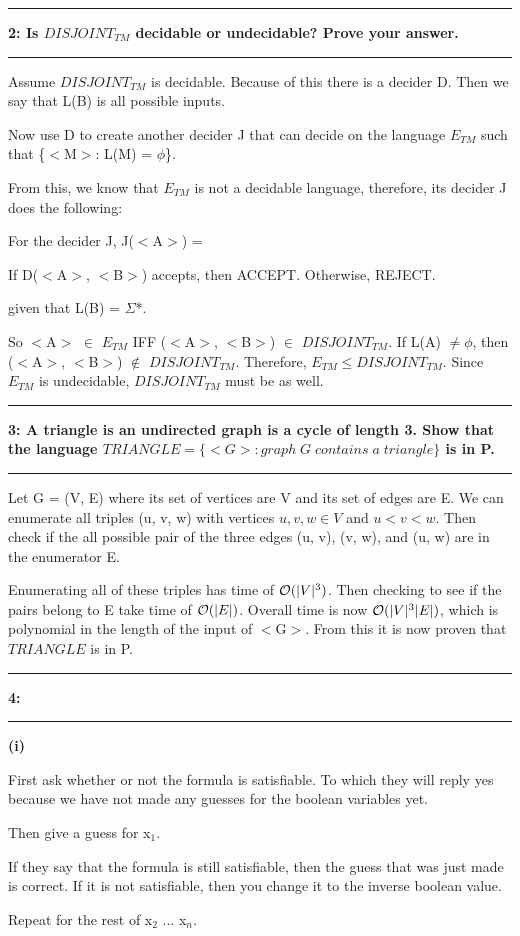 \documentclass[11pt]{article}
\newcommand\question[2]{\vspace{.25in}\hrule\textbf{#1: #2}\vspace{.5em}\hrule\vspace{.10in}}
\renewcommand\part[1]{\vspace{.10in}\textbf{(#1)}\par}
\begin{document}
\question{2}{Is $DISJOINT_{TM}$ decidable or undecidable? Prove your answer.} 
	Assume $DISJOINT_{TM}$ is decidable. Because of this there is a decider D. Then we say that L(B) is all possible inputs.\par
	Now use D to create another decider J that can decide on the language $E_{TM}$ such that \{$<$M$>$: L(M) = $\phi$\}.\par
	From this, we know that $E_{TM}$ is not a decidable language, therefore, its decider J does the following:\par
	For the decider J, J($<$A$>$) =\par
	\quad If D($<$A$>$, $<$B$>$) accepts, then ACCEPT. Otherwise, REJECT.\par
	given that L(B) = $\Sigma$*.\par
	So $<$A$>$ $\in$ $E_{TM}$ IFF ($<$A$>$, $<$B$>$) $\in$ $DISJOINT_{TM}$. If L(A) $\neq \phi$, then ($<$A$>$, $<$B$>$) $\notin$ $DISJOINT_{TM}$. Therefore, $E_{TM} \le DISJOINT_{TM}$. Since $E_{TM}$ is undecidable, $DISJOINT_{TM}$ must be as well.\par
	
\question{3}{A triangle is an undirected graph is a cycle of length 3. Show that the language $TRIANGLE=\{<G>: graph\;G\;contains\;a\;triangle\}$ is in P.}
	Let G = (V, E) where its set of vertices are V and its set of edges are E. We can enumerate all triples (u, v, w) with vertices $u, v, w \in V$ and $u<v<w$. Then check if the all possible pair of the three edges (u, v), (v, w), and (u, w) are in the enumerator E.\par
	Enumerating all of these triples has time of $\mathcal{O} (|V|^{3})$. Then checking to see if the pairs belong to E take time of $\mathcal{O}(|E|)$. Overall time is now $\mathcal{O}(|V|^{3}|E|)$, which is polynomial in the length of the input of $<$G$>$. From this it is now proven that $TRIANGLE$ is in P.\par
	
\question{4}{}
	\part{i}
		First ask whether or not the formula is satisfiable. To which they will reply yes because we have not made any guesses for the boolean variables yet.\par
		Then give a guess for x$_{1}$.\par
		If they say that the formula is still satisfiable, then the guess that was just made is correct. If it is not satisfiable, then you change it to the inverse boolean value.\par
		Repeat for the rest of x$_{2}$ ... x$_{n}$.\par
		
\end{document}
